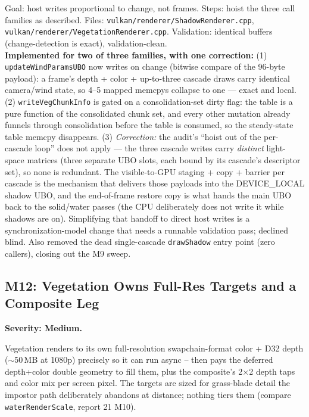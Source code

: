 \documentclass[11pt,a4paper]{article}
\begin{document}
\begin{tcolorbox}[promptbox={Prompt --- M11: still the per-frame host writes}]
Goal: host writes proportional to change, not frames. Steps: hoist the
three call families as described. Files:
\texttt{vulkan/renderer/ShadowRenderer.cpp},
\texttt{vulkan/renderer/VegetationRenderer.cpp}. Validation: identical
buffers (change-detection is exact), validation-clean.
\\ \textbf{Implemented for two of three families, with one correction:}
(1) \texttt{updateWindParamsUBO} now writes on change (bitwise compare of
the 96-byte payload): a frame's depth + color + up-to-three cascade draws
carry identical camera/wind state, so 4--5 mapped memcpys collapse to one
--- exact and local. (2) \texttt{writeVegChunkInfo} is gated on a
consolidation-set dirty flag: the table is a pure function of the
consolidated chunk set, and every other mutation already funnels through
consolidation before the table is consumed, so the steady-state table
memcpy disappears. (3) \emph{Correction:} the audit's ``hoist out of the
per-cascade loop'' does not apply --- the three cascade writes carry
\emph{distinct} light-space matrices (three separate UBO slots, each bound
by its cascade's descriptor set), so none is redundant. The visible-to-GPU
staging + copy + barrier per cascade is the mechanism that delivers those
payloads into the DEVICE\_LOCAL shadow UBO, and the end-of-frame restore
copy is what hands the main UBO back to the solid/water passes (the CPU
deliberately does not write it while shadows are on). Simplifying that
handoff to direct host writes is a synchronization-model change that needs
a runnable validation pass; declined blind. Also removed the dead
single-cascade \texttt{drawShadow} entry point (zero callers), closing out
the M9 sweep.
\end{tcolorbox}

\subsection{M12: Vegetation Owns Full-Res Targets and a Composite Leg}
\label{sec:m12}

\textbf{Severity: Medium.}

Vegetation renders to its own full-resolution swapchain-format color + D32
depth ($\sim$50\,MB at 1080p) precisely so it can run async -- then pays the
deferred depth+color double geometry to fill them, plus the composite's
2$\times$2 depth taps and color mix per screen pixel. The targets are sized
for grass-blade detail the impostor path deliberately abandons at distance;
nothing tiers them (compare \texttt{waterRenderScale}, report 21 M10).
\end{document}
